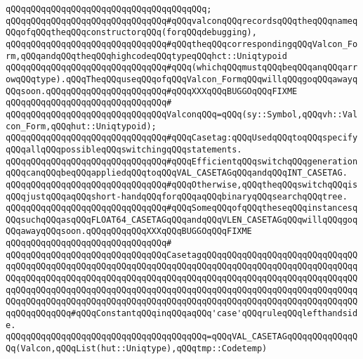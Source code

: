 \verb|qQQqqQQqqQQqqQQqqQQqqQQqqQQqqQQqqQQqqQQq;|\newline
\newline
\verb|qQQqqQQqqQQqqQQqqQQqqQQqqQQqqQQq#qQQqvalconqQQqrecordsqQQqtheqQQqnameqQQqofqQQqtheqQQqconstructorqQQq(forqQQqdebugging),|\newline
\verb|qQQqqQQqqQQqqQQqqQQqqQQqqQQqqQQq#qQQqtheqQQqcorrespondingqQQqValcon_Form,qQQqandqQQqtheqQQqhighcodeqQQqtypeqQQqhct::Uniqtypoid|\newline
\verb|qQQqqQQqqQQqqQQqqQQqqQQqqQQqqQQq#qQQq(whichqQQqmustqQQqbeqQQqanqQQqarrowqQQqtype).qQQqTheqQQquseqQQqofqQQqValcon_FormqQQqwillqQQqgoqQQqawayqQQqsoon.qQQqqQQqqQQqqQQqqQQqqQQq#qQQqXXXqQQqBUGGOqQQqFIXME|\newline
\verb|qQQqqQQqqQQqqQQqqQQqqQQqqQQqqQQq#|\newline
\verb|qQQqqQQqqQQqqQQqqQQqqQQqqQQqqQQqValconqQQq=qQQq(sy::Symbol,qQQqvh::Valcon_Form,qQQqhut::Uniqtypoid);|\newline
\newline
\newline
\verb|qQQqqQQqqQQqqQQqqQQqqQQqqQQqqQQq#qQQqCasetag:qQQqUsedqQQqtoqQQqspecifyqQQqallqQQqpossibleqQQqswitchingqQQqstatements.|\newline
\verb|qQQqqQQqqQQqqQQqqQQqqQQqqQQqqQQq#qQQqEfficientqQQqswitchqQQqgenerationqQQqcanqQQqbeqQQqappliedqQQqtoqQQqVAL_CASETAGqQQqandqQQqINT_CASETAG.|\newline
\verb|qQQqqQQqqQQqqQQqqQQqqQQqqQQqqQQq#qQQqOtherwise,qQQqtheqQQqswitchqQQqisqQQqjustqQQqaqQQqshort-handqQQqforqQQqaqQQqbinaryqQQqsearchqQQqtree.|\newline
\verb|qQQqqQQqqQQqqQQqqQQqqQQqqQQqqQQq#qQQqSomeqQQqofqQQqtheseqQQqinstancesqQQqsuchqQQqasqQQqFLOAT64_CASETAGqQQqandqQQqVLEN_CASETAGqQQqwillqQQqgoqQQqawayqQQqsoon.qQQqqQQqqQQqXXXqQQqBUGGOqQQqFIXME|\newline
\verb|qQQqqQQqqQQqqQQqqQQqqQQqqQQqqQQq#|\newline
\verb|qQQqqQQqqQQqqQQqqQQqqQQqqQQqqQQqCasetagqQQqqQQqqQQqqQQqqQQqqQQqqQQqqQQqqQQqqQQqqQQqqQQqqQQqqQQqqQQqqQQqqQQqqQQqqQQqqQQqqQQqqQQqqQQqqQQqqQQqqQQqqQQqqQQqqQQqqQQqqQQqqQQqqQQqqQQqqQQqqQQqqQQqqQQqqQQqqQQqqQQqqQQqqQQqqQQqqQQqqQQqqQQqqQQqqQQqqQQqqQQqqQQqqQQqqQQqqQQqqQQqqQQqqQQqqQQqqQQqqQQqqQQqqQQqqQQqqQQqqQQqqQQqqQQqqQQqqQQqqQQqqQQqqQQqqQQqqQQqqQQqqQQqqQQqqQQqqQQqqQQq#qQQqConstantqQQqinqQQqaqQQq'case'qQQqruleqQQqlefthandside.|\newline
\verb|qQQqqQQqqQQqqQQqqQQqqQQqqQQqqQQqqQQqqQQq=qQQqVAL_CASETAGqQQqqQQqqQQqqQQq(Valcon,qQQqList(hut::Uniqtype),qQQqtmp::Codetemp)|\newline
